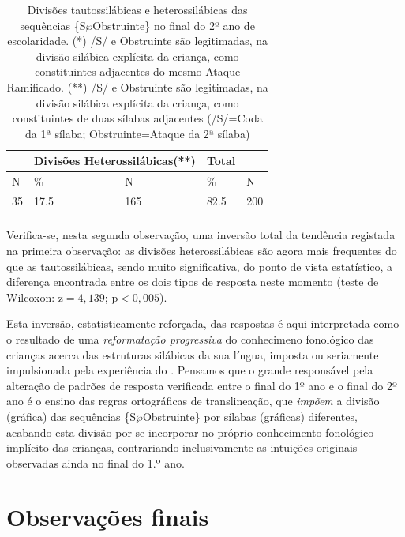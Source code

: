 \documentclass[output=paper]{LSP/langsci}
\begin{document}
\begin{table}[h]
\begin{tabular}{lllll}
\lsptoprule
\multicolumn{2}{l}{Divisões Tautosilábicas(*)} & \multicolumn{2}{l}{Divisões Heterossilábicas(**)} & Total \\
\midrule
N                    & \%                   & N                    & \%                     & N     \\
35                  & 17.5                 & 165                   & 82.5                   & 200  \\
\lspbottomrule
\end{tabular}
\caption{Divisões tautossilábicas e heterossilábicas das sequências \{S$\wp$Obstruinte\} no final do 2º ano de escolaridade. (*) /S/ e Obstruinte são legitimadas, na divisão silábica explícita da criança, como constituintes adjacentes do mesmo Ataque Ramificado. (**) /S/ e Obstruinte são legitimadas, na divisão silábica explícita da criança, como constituintes de duas sílabas adjacentes (/S/=Coda da 1ª sílaba; Obstruinte=Ataque da 2ª sílaba)}
\label{tab:miranda_3}
\end{table}

Verifica-se, nesta segunda observação, uma inversão total da tendência registada na primeira observação: as divisões heterossilábicas são agora mais frequentes do que as tautossilábicas, sendo muito significativa, do ponto de vista estatístico, a diferença encontrada entre os dois tipos de resposta neste momento (teste de Wilcoxon: z$=4,139$; p$<0,005$).

Esta inversão, estatisticamente reforçada, das respostas é aqui interpretada como o resultado de uma \textit{reformatação progressiva} do conhecimeno fonológico das crianças acerca das estruturas silábicas da sua língua, imposta ou seriamente impulsionada pela experiência do . Pensamos que o grande responsável pela alteração de padrões de resposta verificada entre o final do 1º ano e o final do 2º ano é o ensino das regras ortográficas de translineação, que \textit{impõem} a divisão (gráfica) das sequências \{S$\wp$Obstruinte\} por sílabas (gráficas) diferentes, acabando esta divisão por se incorporar no próprio conhecimento fonológico implícito das crianças, contrariando inclusivamente as intuições originais observadas ainda no final do 1.º ano.

\section{Observações finais}
\label{sec:miranda_conclusao}
\end{document}

